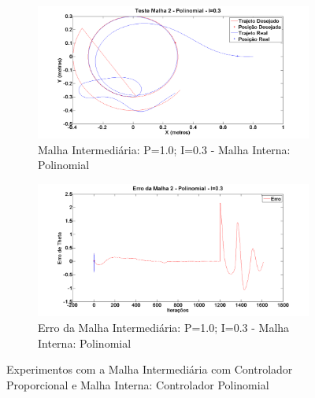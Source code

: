     \begin{figure}[!htb]
    	\centering
    	\begin{subfigure}{1.0\textwidth}
    		\centering
    		\includegraphics[width=.9\linewidth]{./Testes/Malha2/P1.0I0.3/IntegralOsc}
    		\caption{Malha Intermediária: P=1.0; I=0.3 - Malha Interna: Polinomial}
    		\label{fig:m2polpos2}
    	\end{subfigure}
    	\begin{subfigure}{1.0\textwidth}
    		\centering
    		\includegraphics[width=.9\linewidth]{./Testes/Malha2/P1.0I0.3/ErroThetaIOsc}
    		\caption{Erro da Malha Intermediária: P=1.0; I=0.3 - Malha Interna: Polinomial}
    		\label{fig:m2piderr2}
    	\end{subfigure}
    	\caption{Experimentos com a Malha Intermediária com Controlador Proporcional e Malha Interna: Controlador Polinomial}
    	\label{fig:m2pol2}
    \end{figure}



